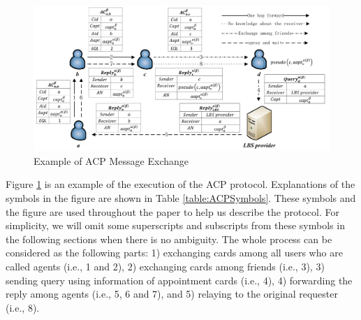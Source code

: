 \documentclass[conference]{IEEEtran}
\begin{document}
\begin{figure}
  \centering 
  \includegraphics[width=6.0in]{figures/IEEEExampleofACPMessageExchange.png}
  \caption{Example of ACP Message Exchange} 
  \label{fig:EoACPME} %
\end{figure}


Figure \ref{fig:EoACPME} is an example of the execution of the ACP protocol. Explanations of the symbols in the figure are shown in Table \ref{table:ACPSymbols}. These symbols and the figure are used throughout the paper to help us describe the protocol. For simplicity, we will omit some superscripts and subscripts from these symbols in the following sections when there is no ambiguity. The whole process can be considered as the following parts: 1) exchanging cards among all users who are called agents (i.e., 1 and 2), 2) exchanging cards among friends (i.e., 3), 3) sending query using information of appointment cards (i.e., 4), 4) forwarding the reply among agents (i.e., 5, 6 and 7), and 5) relaying to the original requester (i.e., 8). 
\end{document}
